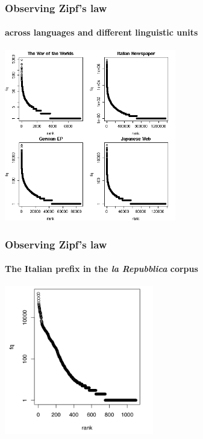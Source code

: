 \documentclass[handout,notes=show,t]{beamer} %
\begin{document}
\begin{frame}
  \frametitle{Observing Zipf's law}
  \framesubtitle{across languages and different linguistic units}

  \ungap[1.5]
  \begin{center}
    \includegraphics[height=7.5cm]{img/othercorporarf}
  \end{center}
\end{frame}

\begin{frame}
  \frametitle{Observing Zipf's law}
  \framesubtitle{The Italian prefix  in the \emph{la Repubblica} corpus}

  \begin{center}
    \includegraphics[height=6.5cm]{img/ita-ri-rf}
  \end{center}
\end{frame}
\end{document}
